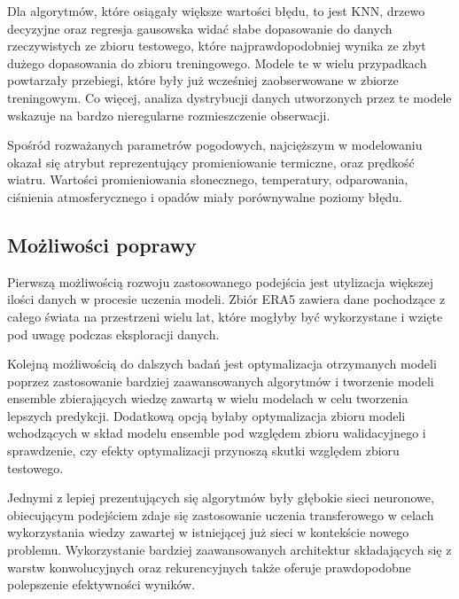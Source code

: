 Dla algorytmów, które osiągały większe wartości błędu, to jest KNN, drzewo decyzyjne
oraz regresja gausowska widać słabe dopasowanie do danych rzeczywistych ze zbioru 
testowego, które najprawdopodobniej wynika ze zbyt dużego dopasowania do zbioru treningowego.
Modele te w wielu przypadkach powtarzały przebiegi, które były już wcześniej
zaobserwowane w zbiorze treningowym. Co więcej, analiza dystrybucji danych utworzonych
przez te modele wskazuje na bardzo nieregularne rozmieszczenie obserwacji.

Spośród rozważanych parametrów pogodowych, najcięższym w modelowaniu okazał
się atrybut reprezentujący promieniowanie termiczne, oraz prędkość wiatru.
Wartości promieniowania słonecznego, temperatury, odparowania, ciśnienia 
atmosferycznego i opadów miały porównywalne poziomy błędu.

\subsection{Możliwości poprawy}

Pierwszą możliwością rozwoju zastosowanego podejścia jest utylizacja większej ilości
danych w procesie uczenia modeli. Zbiór ERA5 zawiera dane pochodzące z całego świata
na przestrzeni wielu lat, które mogłyby być wykorzystane i wzięte pod uwagę podczas
eksploracji danych. 

Kolejną możliwością do dalszych badań jest optymalizacja otrzymanych modeli poprzez 
zastosowanie bardziej zaawansowanych algorytmów i tworzenie modeli ensemble
zbierających wiedzę zawartą w wielu modelach w celu tworzenia lepszych 
predykcji. Dodatkową opcją byłaby optymalizacja zbioru modeli wchodzących w skład
modelu ensemble pod względem zbioru walidacyjnego i sprawdzenie, czy efekty 
optymalizacji przynoszą skutki względem zbioru testowego.

Jednymi z lepiej prezentujących się algorytmów były głębokie sieci neuronowe,
obiecującym podejściem zdaje się zastosowanie uczenia transferowego w celach 
wykorzystania wiedzy zawartej w istniejącej już sieci w kontekście nowego problemu.
Wykorzystanie bardziej zaawansowanych architektur składających się z warstw konwolucyjnych
oraz rekurencyjnych także oferuje prawdopodobne polepszenie efektywności wyników.


